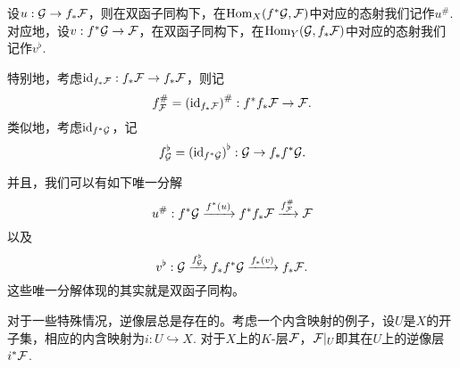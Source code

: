 
设$u:\mathcal{G}\to f_*\mathcal{F}$，则在双函子同构下，在$\operatorname{Hom}_X(f^*\mathcal{G},\mathcal{F})$中对应的态射我们记作$u^\#$. 对应地，设$v:f^*\mathcal{G}\to \mathcal{F}$，在双函子同构下，在$\operatorname{Hom}_Y(\mathcal{G},f_*\mathcal{F})$中对应的态射我们记作$v^\flat$.

特别地，考虑$\operatorname{id}_{f_*\mathcal{F}}:f_*\mathcal{F}\to f_*\mathcal{F}$，则记
\[
	f^\#_{\mathcal{F}}=\left(\operatorname{id}_{f_*\mathcal{F}}\right)^\#: f^*f_*\mathcal{F} \to \mathcal{F}.
\]
类似地，考虑$\operatorname{id}_{f^*\mathcal{G}}$，记
\[
	f^\flat_{\mathcal{G}} =\left(\operatorname{id}_{f^*\mathcal{G}}\right)^\flat : \mathcal{G} \to f_*f^*\mathcal{G}.
\]

并且，我们可以有如下唯一分解
\[
	u^\#: f^*\mathcal{G} \xrightarrow{f^*(u)} f^*f_*\mathcal{F} \xrightarrow{f^\#_{\mathcal{F}}}\mathcal{F}
\]
以及
\[
	v^\flat : \mathcal{G} \xrightarrow{f^\flat_{\mathcal{G}}} f_*f^*\mathcal{G}\xrightarrow{f_*(v)} f_*\mathcal{F}.
\]
这些唯一分解体现的其实就是双函子同构。

\begin{pro}
\label{pro:1}对于一些特殊情况，逆像层总是存在的。考虑一个内含映射的例子，设$U$是$X$的开子集，相应的内含映射为$i:U\hookrightarrow X$. 对于$X$上的$K$-层$\mathcal{F}$，$\mathcal{F}|_U$即其在$U$上的逆像层$i^*\mathcal{F}$.
\end{pro}

